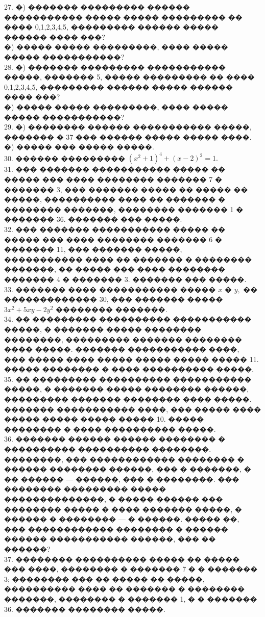 \documentclass[12pt]{article}
\begin{document}
27. �) ������� ��������� ������ ����������� ����� ����� ��������� �� ���� 0,1,2,3,4,5, ��������� ������ ����� ������ ���� ���?\\
�) ����� ����� ���������, ���� ����� ����� �����������?\\
28. �) ������� ��������� ����������� �����, ������� 5, ����� ��������� �� ���� 0,1,2,3,4,5, ��������� ������ ����� ������ ���� ���?\\
�) ����� ����� ���������, ���� ����� ����� �����������?\\
29. �) �������� ������ ����������� �����, ������� � 37 ��� ������ ����� ����� ����.\\
�) ����� ��� ����� �����.\\
30. ������ ��������� $(x^2+1)^4+(x-2)^2=1.$\\
31. ��� ������� ����������� ����� �� ����� ��� ���� �������� ������� 7 � ������� 3, ��� ������� ����� �� ����� �� �����, ���������� ���� �� ������� � �������� �������, �������� ������� 1 � ������� 36. ������� ��� �����.\\
32. ��� ������� ����������� ����� �� ����� ��� ���� �������� ������� 6 � ������� 11, ��� ������� �����, ����������� ���� �� ������� � �������� �������, �� ����� ��� ���� �������� ������� 4 � ������� 3. ������� ��� �����.\\
33. ������� ���� ����������� ����� $x$ � $y,$ �� ������������� 30, ��� ������� ����� $3x^2+5xy-2y^2$ �������� �������.\\
34. �� ��������� ���������� ����������� �����, � ������� ����� �������� ��������, ��������� ������� �������� ���� �����. ������� ����������� ����, ��� ����� ���� ����� ����� ����� ����� 11. ����� �������� � ���� ���������� �����.\\
35. �� ��������� ���������� ����������� �����, � ������� ����� �������� ������, ��������� ������� �������� ���� �����. ������� ����������� ����, ��� ����� ���� ����� ����� ����� ����� 10. ����� �������� � ���� ���������� �����.\\
36. ������� ������ ������ �������� � ���������� ���������� ��������. ��������, ��� ������������ �������� � ������ �������� ������, ��� � �������, � �� ������ --- ������, ��� � ��������. ��� �������� ��������� ����� ��������������, � ����� ������ ��� �������� ����� � ���� ������� �����, � ������ � �������� --- � ������. ����� ��, ��� ������������ �������� � ������ ������ ����������� ������, ��� �� ������?\\
37. �������� ���������� ����� �� ����� ��� ����, �������� � ������� 7 � � ������� 3; �������� ��� �� ����� �� �����, ���������� ���� �� ������� � �������� �������, �������� � ������� 1, � � ������� 36. ������� �������� �����.\\
\end{document}
